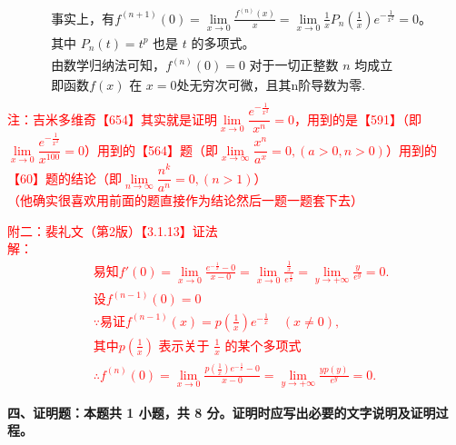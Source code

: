 \documentclass[a4paper,12pt]{article}
\begin{document}
\begin{enumerate}
{\begin{align*}
        & \text{事实上，有} f^{(n+1)}(0) = \lim_{x \to 0} \frac{f^{(n)}(x)}{x} = \lim_{x \to 0} \frac{1}{x} P_n \left( \frac{1}{x} \right) e^{-\frac{1}{x^2}} = 0。 \\
        & \text{其中 } P_n(t) = t^p \text{ 也是 } t \text{ 的多项式。} \\[0.5em]
        & \text{由数学归纳法可知，} f^{(n)}(0) = 0 \text{ 对于一切正整数 } n \text{ 均成立}\\[0.5em]
        & \text{即函数}  f(x) \text{ 在 } x = 0  \text{处无穷次可微，且其n阶导数为零.}\\
        \end{align*}
    }
    \textcolor{red}{
    注：吉米多维奇【654】其实就是证明$\underset{x \to 0}{\lim}\dfrac{e^{-\frac{1}{x^2}}}{x^n}=0$，用到的是【591】（即$\underset{x \to 0}{\lim}\dfrac{e^{-\frac{1}{x^2}}}{x^{100}}=0$）用到的【564】题（即$\underset{x \to \infty}{\lim}\dfrac{x^n}{a^x}=0, (a>0,n>0)$）用到的【60】题的结论（即$\underset{n \to \infty}{\lim}\dfrac{n^k}{a^n}=0, (n>1)$）\\
    （他确实很喜欢用前面的题直接作为结论然后一题一题套下去）\\[5em]
    }
    
    \textcolor{red}{
    附二：裴礼文（第2版）【3.1.13】证法\\
    解：
    \begin{align*}
        & \text{易知}f'(0) = \lim_{x \to 0} \frac{e^{-\frac{1}{x}} - 0}{x - 0} = \lim_{x \to 0} \frac{\frac{1}{x}}{e^{\frac{1}{x}}} = \lim_{y \to +\infty} \frac{y}{e^y} = 0. \\
        & \text{设} f^{(n-1)}(0) = 0 \\
        & \because \text{易证} f^{(n-1)}(x) = p\left( \frac{1}{x} \right) e^{-\frac{1}{x}} \quad (x \ne 0), \\
        & \text{其中} p\left( \frac{1}{x} \right) \text{ 表示关于 } \frac{1}{x} \text{ 的某个多项式} \\
        & \therefore f^{(n)}(0) = \lim_{x \to 0} \frac{p\left( \frac{1}{x} \right) e^{-\frac{1}{x}} - 0}{x - 0} = \lim_{y \to +\infty} \frac{y p(y)}{e^y} = 0.
        \end{align*}
    }




\end{enumerate}


\noindent
\textbf{四、证明题：本题共 1 小题，共 8 分。证明时应写出必要的文字说明及证明过程。}
\end{document}
